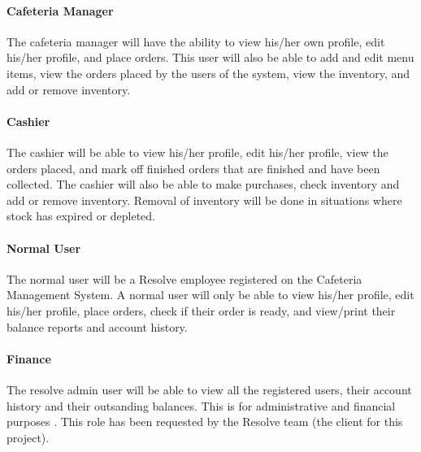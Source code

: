 \documentclass[a4paper,12pt]{article}
\begin{document}
\paragraph{ Cafeteria Manager\\}
The cafeteria manager will have the ability to view his/her own profile, edit his/her profile, and place orders. This user will also be able to add and edit menu items, view the orders placed by the users of the system, view the inventory, and add or remove inventory. 

\paragraph{ Cashier\\}
The cashier will be able to view his/her profile, edit his/her profile, view the orders placed, and mark off finished orders that are finished and have been collected. The cashier will also be able to make purchases, check inventory and add or remove inventory. Removal of inventory will be done in situations where stock has expired or depleted.

\paragraph{ Normal User\\}
The normal user will be a Resolve employee registered on the Cafeteria Management System.  A normal user will only be able to view his/her profile, edit his/her profile, place orders, check if their order is ready, and view/print their balance reports and account history.

\paragraph{ Finance \\}
The resolve admin user will be able to view all the registered users, their account history and their outsanding balances. This is for administrative and financial purposes . This role has been requested by the Resolve team (the client for this project).

\end{document}

